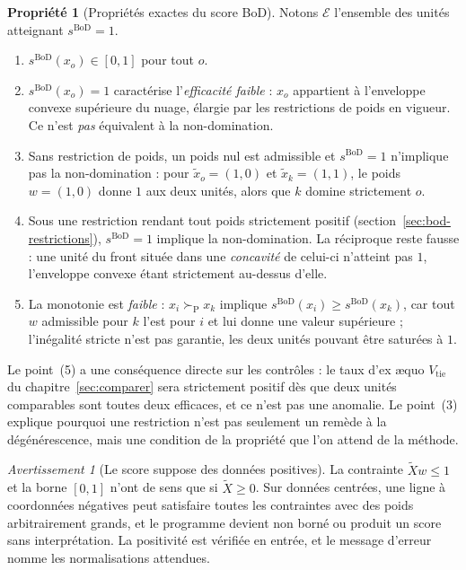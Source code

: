 \documentclass[11pt,a4paper]{article}
\theoremstyle{definition}
\newtheorem{propriete}{Propriété}[section]
\theoremstyle{remark}
\newtheorem{avertissement}{Avertissement}[section]
\newcommand{\pareto}{\succ_{\mathrm{P}}}
\begin{document}
\begin{propriete}[Propriétés exactes du score BoD]
  \label{prop:bod}
  Notons $\mathcal{E}$ l'ensemble des unités atteignant $s^{\mathrm{BoD}} = 1$.

  \medskip

  \begin{enumerate}[nosep,leftmargin=1.8em]
    \item $s^{\mathrm{BoD}}(x_o) \in [0,1]$ pour tout $o$.
    \item $s^{\mathrm{BoD}}(x_o) = 1$ caractérise l'\emph{efficacité faible} : $x_o$
    appartient à l'enveloppe convexe supérieure du nuage, élargie par les restrictions de
    poids en vigueur. Ce n'est \emph{pas} équivalent à la non-domination.
    \item Sans restriction de poids, un poids nul est admissible et $s^{\mathrm{BoD}} = 1$
    n'implique pas la non-domination : pour $\tilde{x}_o = (1,0)$ et
    $\tilde{x}_k = (1,1)$, le poids $w = (1,0)$ donne $1$ aux deux unités, alors que $k$
    domine strictement $o$.
    \item Sous une restriction rendant tout poids strictement positif
    (section~\ref{sec:bod-restrictions}), $s^{\mathrm{BoD}} = 1$ implique la
    non-domination. La réciproque reste fausse : une unité du front située dans une
    \emph{concavité} de celui-ci n'atteint pas $1$, l'enveloppe convexe étant strictement
    au-dessus d'elle.
    \item La monotonie est \emph{faible} : $x_i \pareto x_k$ implique
    $s^{\mathrm{BoD}}(x_i) \ge s^{\mathrm{BoD}}(x_k)$, car tout $w$ admissible pour $k$
    l'est pour $i$ et lui donne une valeur supérieure ; l'inégalité stricte n'est pas
    garantie, les deux unités pouvant être saturées à $1$.
  \end{enumerate}
\end{propriete}

\bigskip

Le point~(5) a une conséquence directe sur les contrôles : le taux d'ex \ae quo
$V_{\mathrm{tie}}$ du chapitre~\ref{sec:comparer} sera strictement positif dès que deux
unités comparables sont toutes deux efficaces, et ce n'est pas une anomalie. Le point~(3)
explique pourquoi une restriction n'est pas seulement un remède à la dégénérescence, mais
une condition de la propriété que l'on attend de la méthode.

\medskip

\begin{avertissement}[Le score suppose des données positives]
  \label{av:bod-positif}
  La contrainte $\tilde{X}w \le 1$ et la borne $[0,1]$ n'ont de sens que si
  $\tilde{X} \ge 0$. Sur données centrées, une ligne à coordonnées négatives peut
  satisfaire toutes les contraintes avec des poids arbitrairement grands, et le programme
  devient non borné ou produit un score sans interprétation. La positivité est vérifiée en
  entrée, et le message d'erreur nomme les normalisations attendues.
\end{avertissement}
\end{document}
